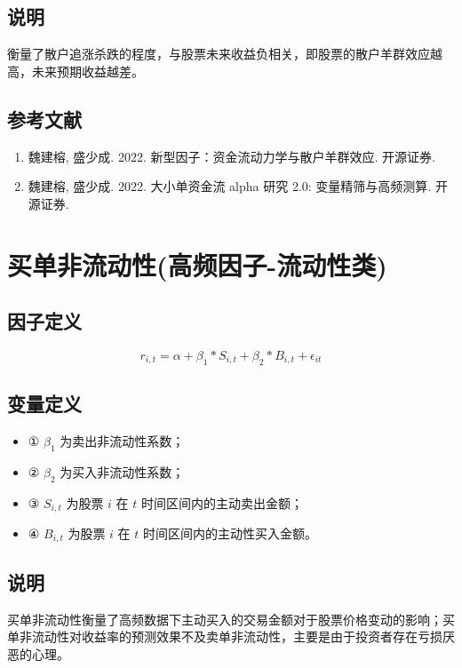 \documentclass{article}
\begin{document}
\subsection{说明}
衡量了散户追涨杀跌的程度，与股票未来收益负相关，即股票的散户羊群效应越高，未来预期收益越差。

\subsection{参考文献}
\begin{enumerate}
    \item 魏建榕, 盛少成. 2022. 新型因子：资金流动力学与散户羊群效应. 开源证券.
    \item 魏建榕, 盛少成. 2022. 大小单资金流 alpha 研究 2.0: 变量精筛与高频测算. 开源证券.
\end{enumerate}

\section{买单非流动性(高频因子-流动性类)}

\subsection{因子定义}
\begin{equation}
    r_{i,t} = \alpha + \beta_1 * S_{i,t} + \beta_2 * B_{i,t} + \epsilon_{it}
\end{equation}

\subsection{变量定义}
\begin{itemize}
    \item ① \( \beta_1 \) 为卖出非流动性系数；
    \item ② \( \beta_2 \) 为买入非流动性系数；
    \item ③ \( S_{i,t} \) 为股票 \( i \) 在 \( t \) 时间区间内的主动卖出金额；
    \item ④ \( B_{i,t} \) 为股票 \( i \) 在 \( t \) 时间区间内的主动性买入金额。
\end{itemize}

\subsection{说明}
买单非流动性衡量了高频数据下主动买入的交易金额对于股票价格变动的影响；买单非流动性对收益率的预测效果不及卖单非流动性，主要是由于投资者存在亏损厌恶的心理。
\end{document}
